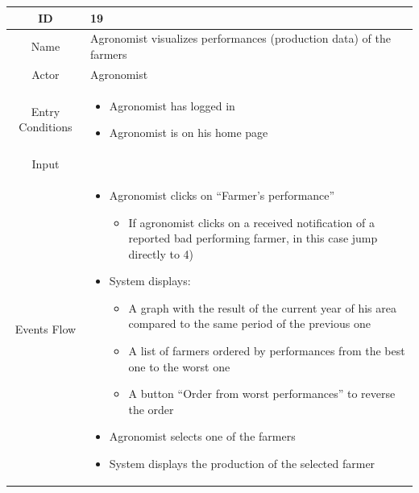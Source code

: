 \documentclass{article}
\begin{document}
\begin{center}
    \begin{longtable}{|c| p{10cm}|}
        \hline
            ID & 19 \\
        \hline
            Name & Agronomist visualizes performances (production data) of the farmers\\
        \hline
            Actor & Agronomist \\
        \hline
            Entry Conditions &  \begin{itemize}
                                    \item Agronomist has logged in
                                    \item Agronomist is on his home page
                                \end{itemize}\\
        \hline
            Input &  \\
        \hline
            Events Flow &   \begin{itemize}
                                \item Agronomist clicks on “Farmer’s performance” 
                                            \begin{itemize}
                                                \item If agronomist clicks on a received notification of a reported bad performing farmer, in this case jump directly to 4)
                                            \end{itemize}
                                \item System displays:
                                            \begin{itemize}
                                                \item A graph with the result of the current year of his area compared to the same period of the previous one 
                                                \item A list of farmers ordered by performances from the best one to the worst one 
                                                \item A button “Order from worst performances” to reverse the order
                                            \end{itemize}
                                \item Agronomist selects one of the farmers
                                \item System displays the production of the selected farmer

\end{itemize}
\end{longtable}
\end{center}
\end{document}

